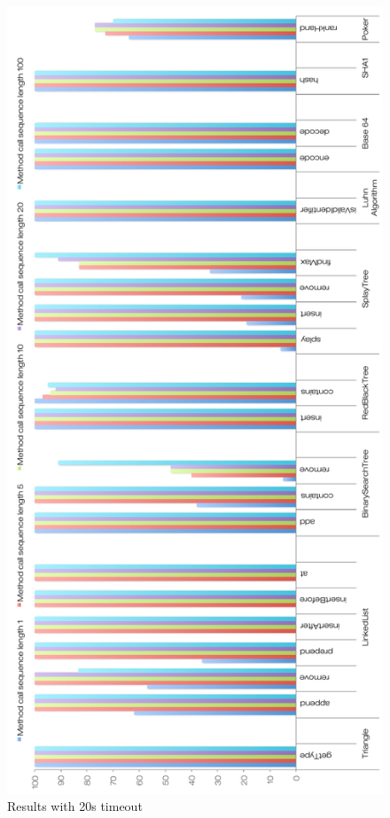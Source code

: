 \begin{figure}[h]
\vspace*{-2.5cm}
\centering
\includegraphics[scale=0.56]{./components/chapter7/20sr.pdf}
\caption{Results with 20s timeout}
\label{20s}
\end{figure}

